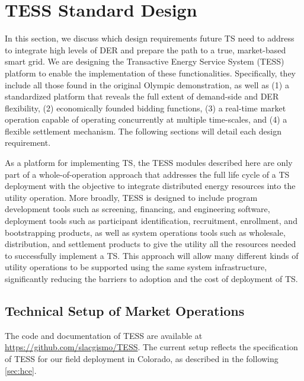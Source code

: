 \section{TESS Standard Design}\label{sec:standard_design}

In this section, we discuss which design requirements future TS need to address to integrate high levels of DER and prepare the path to a true, market-based smart grid.
We are designing the Transactive Energy Service System (TESS) platform to enable the implementation of these functionalities.
Specifically, they include all those found in the original Olympic demonstration, as well as (1) a standardized platform that reveals the full extent of demand-side and DER flexibility, (2) economically founded bidding functions, (3) a real-time market operation capable of operating concurrently at multiple time-scales, and (4) a flexible settlement mechanism. The following sections will detail each design requirement.

As a platform for implementing TS, the TESS modules described here are only part of a whole-of-operation approach that addresses the full life cycle of a TS deployment with the objective to integrate distributed energy resources into the utility operation.  
More broadly, TESS is designed to include program development tools such as screening, financing, and engineering software, deployment tools such as participant identification, recruitment, enrollment, and bootstrapping products, as well as system operations tools such as wholesale, distribution, and settlement products to give the utility all the resources needed to successfully implement a TS.
This approach will allow many different kinds of utility operations to be supported using the same system infrastructure, significantly reducing the barriers to adoption and the cost of deployment of TS. 

\subsection{Technical Setup of Market Operations}\label{sec:technical_setup}

The code and documentation of TESS are available at \url{https://github.com/slacgismo/TESS}. The current setup reflects the specification of TESS for our field deployment in Colorado, as described in the following \cref{sec:hce}.


